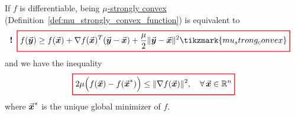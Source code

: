 \newlength{}
{}
\newlength{}
{} 
\begin{lemma}
\label{lem:optimality_error_strongly_convex}
If \(f\) is differentiable, being \hyperref[def:mu_strongly_convex_function]{\(\mu\)-strongly convex} (Definition~\ref{def:mu_strongly_convex_function}) is equivalent to
\begin{equation}
\label{eq:strong_convex_differentiable_inequality} %
\llap{\textbf{!}\enspace}
{\color{Red}
\setlength{\fboxrule}{1pt}
\boxed{ 
\color{black}
f(\vect{y})\ge f(\vect{x})+\nabla f(\vect{x})^{T}(\vect{y}-\vect{x})
+\frac{\mu}{2}\|\vect{y}-\vect{x}\|^{2}\tikzmark{mu_strong_convex}%
}
}
\end{equation}
and we have the inequality
\begin{equation}
\label{eq:optimality_error_inequality}
{\color{Red}
\setlength{\fboxrule}{1pt}
\boxed{ 
\color{black}
2\mu\Bigl(f(\vect{x})-f(\vect{x}^{*})\Bigr)\le\|\nabla f(\vect{x})\|^{2},\quad\forall\,\vect{x}\in\mathbb{R}^{n}
}
}
\end{equation}
where \(\vec{\boldsymbol{x}}^{*}\) is the unique global minimizer of \(f\). 
\end{lemma}
